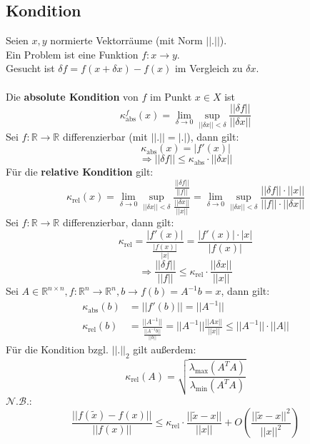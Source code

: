 \documentclass[a4paper,twocolumn,10pt]{article}
\begin{document}
\subsection{Kondition}
Seien $x,y$ normierte Vektorräume (mit Norm $||.||$).\\
Ein Problem ist eine Funktion $f:x\rightarrow y$.\\
Gesucht ist $\delta f=f(x+\delta x)-f(x)$ im Vergleich zu $\delta x$.\\\\
Die \textbf{absolute Kondition} von $f$ im Punkt $x\in X$ ist
\begin{equation*}
\kappa_{\text{abs}}^f(x)=\lim\limits_{\delta\rightarrow 0}\sup\limits_{||\delta x||<\delta}\frac{||\delta f||}{||\delta x||}
\end{equation*}
Sei $f:\mathbb{R}\rightarrow\mathbb{R}$ differenzierbar (mit $||.||=|.|$), dann gilt:
\begin{equation*}
\kappa_{\text{abs}}(x)=|f'(x)|
\end{equation*}
\begin{equation*}
\Rightarrow||\delta f||\leq \kappa_{\text{abs}}\cdot ||\delta x||
\end{equation*}
Für die \textbf{relative Kondition} gilt:
\begin{equation*}
\kappa_{\text{rel}}(x)=\lim\limits_{\delta\rightarrow 0}\sup\limits_{||\delta x||<\delta} \frac{\frac{||\delta f||}{||f||}}{\frac{||\delta x||}{||x||}}=\lim\limits_{\delta\rightarrow 0}\sup\limits_{||\delta x||<\delta} \frac{||\delta f||\cdot ||x||}{||f||\cdot ||\delta x||}
\end{equation*}
Sei $f:\mathbb{R}\rightarrow\mathbb{R}$ differenzierbar, dann gilt:
\begin{equation*}
\kappa_{\text{rel}}=\frac{|f'(x)|}{\frac{|f(x)|}{|x|}}=\frac{|f'(x)|\cdot |x|}{|f(x)|}
\end{equation*}
\begin{equation*}
\Rightarrow\frac{||\delta f||}{||f||}\leq \kappa_{\text{rel}}\cdot\frac{||\delta x||}{||x||}
\end{equation*}
Sei $A\in\mathbb{R}^{n\times n},f:\mathbb{R}^n\rightarrow\mathbb{R}^n,b\rightarrow f(b)=A^{-1}b=x$, dann gilt:
\begin{equation*}
\begin{split}
\kappa_{\text{abs}}(b)&=||f'(b)||=||A^{-1}||\\
\kappa_{\text{rel}}(b)&=\frac{||A^{-1}||}{\frac{||A^{-1}b||}{||b||}}=||A^{-1}||\frac{||Ax||}{||x||}\leq||A^{-1}||\cdot ||A||
\end{split}
\end{equation*}
Für die Kondition bzgl. $||.||_2$ gilt außerdem:
\begin{equation*}
\kappa_{\text{rel}}(A)=\sqrt{\frac{\lambda_{\text{max}}(A^TA)}{\lambda_{\text{min}}(A^TA)}}
\end{equation*}
$\mathcal{N.B.}$:
\begin{equation*}
\frac{||f(\tilde{x})-f(x)||}{||f(x)||}\leq \kappa_{\text{rel}}\cdot\frac{||\tilde{x}-x||}{||x||}+O\left(\frac{||\tilde{x}-x||^2}{||x||^2}\right)
\end{equation*}
\end{document}
